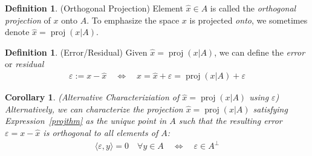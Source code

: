 \documentclass[12pt]{article}
\numberwithin{equation}{section} %
\theoremstyle{plain}
\newtheorem{cor}[thm]{Corollary}
\theoremstyle{definition}
\newtheorem{defn}[thm]{Definition}
\theoremstyle{remark}
\newcommand{\proj}{\operatorname{proj}}
\begin{document}
\begin{defn}(Orthogonal Projection)
Element $\hat{x}\in A$ is called the \emph{orthogonal projection} of
$x$ onto $A$. To emphasize the space $x$ is projected \emph{onto}, we
sometimes denote $\hat{x}=\proj(x|A)$.
\end{defn}

\begin{defn}(Error/Residual)
Given $\hat{x}=\proj(x|A)$, we can define the \emph{error} or
\emph{residual}
\begin{align*}
  \varepsilon:=x-\hat{x}
  \quad\iff\quad
  x=\hat{x}+\varepsilon=\proj(x|A)+\varepsilon
\end{align*}
\end{defn}

\begin{cor}
\emph{(Alternative Characteriziation of $\hat{x}=\proj(x|A)$ using
$\varepsilon$)}
Alternatively, we can characterize the projection $\hat{x}=\proj(x|A)$
satisfying Expression~\ref{projthm} as the unique point in $A$ such that
the resulting error $\varepsilon=x-\hat{x}$ is orthogonal to all
elements of $A$:
\begin{align*}
  \langle \varepsilon, y\rangle =0
  \quad\forall y\in A
  \quad\iff\quad
  \varepsilon\in A^\perp
\end{align*}
\end{cor}
\end{document}
